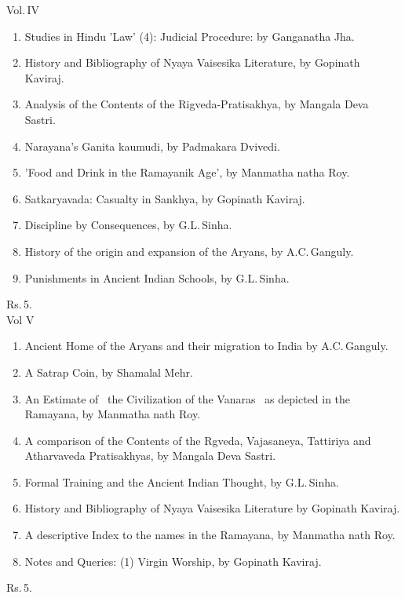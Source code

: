 \documentclass[11pt, openany]{book}
\begin{document}
\begin{sloppypar}
\noindent Vol.\,IV\textendash 
\vspace{-2mm}

\begin{enumerate}[\indent(a)]
\setlength{\itemsep}{0pt}
\setlength{\parskip}{0pt}
\item Studies in Hindu 'Law' (4): Judicial Procedure: by Ganganatha Jha.
\item History and Bibliography of Nyaya Vaisesika Literature, by Gopinath Kaviraj.
\item Analysis of the Contents of the Rigveda-Pratisakhya, by Mangala Deva Sastri.
\item Narayana's Ganita kaumudi, by Padmakara Dvivedi.
\item 'Food and Drink in the Ramayanik Age', by Manmatha natha Roy.
\item Satkaryavada: Casualty in Sankhya, by Gopinath Kaviraj.
\item Discipline by Consequences, by G.L.\,Sinha.
\item History of the origin and expansion of the Aryans, by A.C.\,Ganguly.
\item Punishments in Ancient Indian Schools, by G.L.\,Sinha.
\end{enumerate}
\vspace{-4mm}

\hfill Rs.\,5.\\

\noindent Vol V\textendash 
\vspace{-2mm}

\begin{enumerate}[\indent(a)]
\setlength{\itemsep}{0pt}
\setlength{\parskip}{0pt}
\item Ancient Home of the Aryans and their migration to India by A.C.\,Ganguly.
\item A Satrap Coin, by Shamalal Mehr.
\item An Estimate of ~the Civilization of the Vanaras~ as depicted in the Ramayana, by Manmatha nath Roy.
\item A comparison of the Contents of the Rgveda, Vajasaneya, Tattiriya and Atharvaveda Pratisakhyas, by Mangala Deva Sastri.
\item Formal Training and the Ancient Indian Thought, by G.L.\,Sinha.
\item History and Bibliography of Nyaya Vaisesika Literature by Gopinath Kaviraj.
\item A descriptive Index to the names in the Ramayana, by Manmatha nath Roy.
\item Notes and Queries: (1) Virgin Worship, by Gopinath Kaviraj.
\end{enumerate}
\vspace{-4mm}

\hfill Rs.\,5.
\end{sloppypar}
\end{document}
